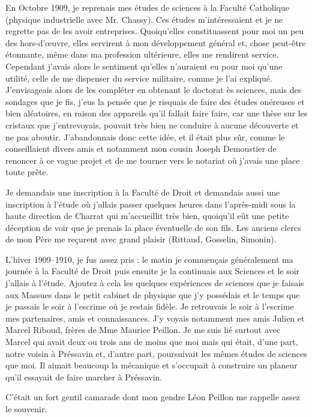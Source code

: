 \documentclass[11pt,a4paper]{report}
\begin{document}
En Octobre 1909, je reprenais mes études de sciences à la Faculté Catholique (physique industrielle avec Mr. Chassy). Ces études m'intéressaient et je ne regrette pas de les avoir entreprises. Quoiqu'elles constituassent pour moi un peu des hors-d'œuvre, elles servirent à mon développement général et, chose peut-être étonnante, même dans ma profession ultérieure, elles me rendirent service. Cependant j'avais alors le sentiment qu'elles n'auraient eu pour moi qu'une utilité, celle de me dispenser du service militaire, comme je l'ai expliqué. J'envisageais alors de les compléter en obtenant le doctorat ès sciences, mais des sondages que je fis, j'eus la pensée que je risquais de faire des études onéreuses et bien aléatoires, en raison des appareils qu'il fallait faire faire, car une thèse sur les cristaux que j'entrevoyais, pouvait très bien ne conduire à aucune découverte et ne pas aboutir. J'abandonnais donc cette idée, et il était plus sûr, comme le conseillaient divers amis et notamment mon cousin Joseph Demoustier de renoncer à ce vague projet et de me tourner vers le notariat où j'avais une place toute prête.

Je demandais une inscription à la Faculté de Droit et demandais aussi une inscription à l'étude où j'allais passer quelques heures dans l'après-midi sous la haute direction de Charrat qui m'accueillit très bien, quoiqu'il eût une petite déception de voir que je prenais la place éventuelle de son fils. Les anciens clercs de mon Père me reçurent avec grand plaisir (Rittaud, Gosselin, Simonin).

L'hiver 1909--1910, je fus assez pris : le matin je commençais généralement ma journée à la Faculté de Droit puis ensuite je la continuais aux Sciences et le soir j'allais à l'étude. Ajoutez à cela les quelques expériences de sciences que je faisais aux Massues dans le petit cabinet de physique que j'y possédais et le temps que je passais le soir à l'escrime où je restais fidèle. Je retrouvais le soir à l'escrime mes partenaires, amis et connaissances. J'y voyais notamment mes amis Julien et Marcel Riboud, frères de Mme Maurice Peillon. Je me suis lié surtout avec Marcel qui avait deux ou trois ans de moins que moi mais qui était, d'une part, notre voisin à Préssavin et, d'autre part, poursuivait les mêmes études de sciences que moi. Il aimait beaucoup la mécanique et s'occupait à construire un planeur qu'il essayait de faire marcher à Préssavin.

C'était un fort gentil camarade dont mon gendre Léon Peillon me rappelle assez le souvenir.
\end{document}
